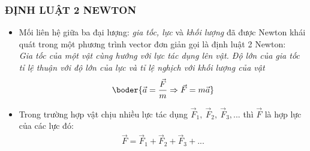 \subsubsection{ĐỊNH LUẬT 2 NEWTON}
\begin{itemize}
\item Mối liên hệ giữa ba đại lượng: \textit{gia tốc, lực} và \textit{khối lượng} đã được Newton khái quát trong một phương trình vector đơn giản gọi là định luật 2 Newton:\\
\textit{Gia tốc của một vật cùng hướng với lực tác dụng lên vật. Độ lớn của gia tốc tỉ lệ thuận với độ lớn của lực và tỉ lệ nghịch với khối lượng của vật}
\begin{align*}
\boder{\vec{a}=\dfrac{\vec F}{m}\Rightarrow \vec F=m\vec a}
\end{align*}
\item Trong trường hợp vật chịu nhiều lực tác dụng $\vec F_1,\ \vec F_2,\ \vec F_3,...$ thì $\vec F$ là hợp lực của các lực đó:
\begin{align*}
\vec F=\vec F_1+\vec F_2+\vec F_3+...
\end{align*}
\end{itemize}	

